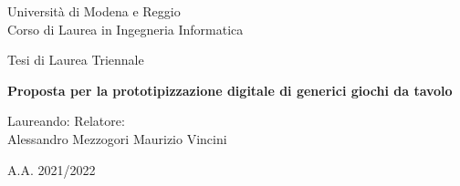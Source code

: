 \begin{titlepage}
\begin{center}
\vspace*{1cm}
\LARGE Università di Modena e Reggio \\
\large Corso di Laurea in Ingegneria Informatica \\
\vspace*{3cm}

\large
Tesi di Laurea Triennale
\vspace*{3cm}

\huge
\textbf{Proposta per la prototipizzazione digitale di generici giochi da tavolo}

\vspace*{4cm}
\large
Laureando:  \hfill Relatore: \\
Alessandro Mezzogori \hfill Maurizio Vincini

\vfill
\large A.A. 2021/2022

\end{center}
\end{titlepage}